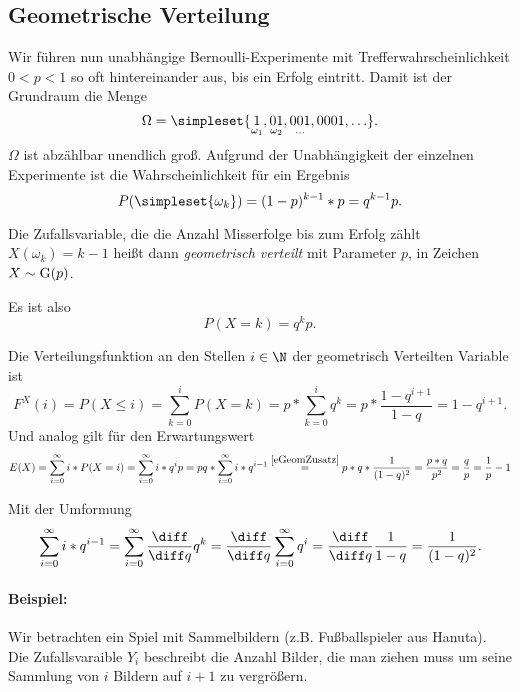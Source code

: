 \subsection{Geometrische Verteilung}
Wir führen nun unabhängige Bernoulli-Experimente mit Trefferwahrscheinlichkeit $0<p<1$ so oft hintereinander aus, bis ein Erfolg eintritt. Damit ist der Grundraum die Menge
\begin{equation*}
	\Omega =\simpleset{\underset{\omega_1}{1},\underset{\omega_2}{01},\underset{\ldots}{001},0001,\ldots}.
\end{equation*}
$\Omega$ ist abzählbar unendlich groß. Aufgrund der Unabhängigkeit der einzelnen Experimente ist die Wahrscheinlichkeit für ein Ergebnis
\begin{equation*}
	P(\simpleset{\omega_k})=(1-p)^{k-1}*p=q^{k-1}p.
\end{equation*}

Die Zufallsvariable, die die Anzahl Misserfolge bis zum Erfolg zählt $X(\omega_k)=k-1$ heißt dann \emph{geometrisch verteilt} mit Parameter $p$, in Zeichen $X\sim \operatorname{G}(p)$.

Es ist also
\begin{equation*}
	P(X=k)=q^kp.
\end{equation*}

Die Verteilungsfunktion an den Stellen $i\in \N$ der geometrisch Verteilten Variable ist
\begin{equation*}
	F^X(i)=P(X\leq i) = \sum_{k=0}^i P(X=k)=p*\sum_{k=0}^i q^k=p*\frac{1-q^{i+1}}{1-q}=1-q^{i+1}.
\end{equation*}
Und analog gilt für den Erwartungswert
\begin{equation*}
 	E(X)=\sum_{i=0}^\infty i*P(X=i)=\sum_{i=0}^\infty i*q^ip=pq*\sum_{i=0}^\infty i*q^{i-1}\overset{\ref{eGeomZusatz}}=p*q*\frac1{(1-q)^2}=\frac{p*q}{p^2}=\frac qp=\frac1p-1
\end{equation*} 

Mit der Umformung
\begin{equation}
	\sum_{i=0}^\infty i*q^{i-1}=\sum_{i=0}^\infty \frac{\diff}{\diff q} q^k=\frac{\diff}{\diff q} \sum_{i=0}^\infty q^i = \frac{\diff}{\diff q}\frac{1}{1-q}=\frac{1}{(1-q)^2}.\label{eGeomZusatz}
\end{equation}


\paragraph{Beispiel:}
Wir betrachten ein Spiel mit Sammelbildern (z.B. Fußballspieler aus Hanuta). Die Zufallsvaraible $Y_i$ beschreibt die Anzahl Bilder, die man ziehen muss um seine Sammlung von $i$ Bildern auf $i+1$ zu vergrößern.

